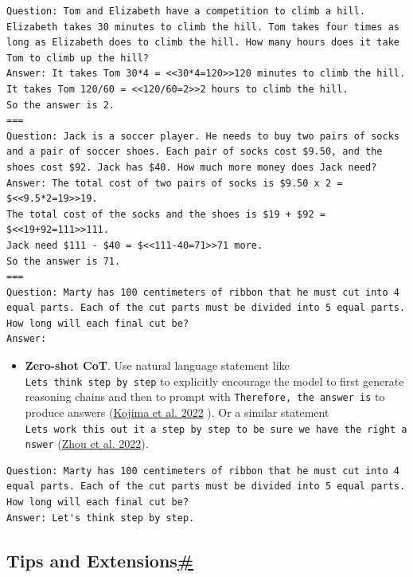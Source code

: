 \begin{verbatim}
Question: Tom and Elizabeth have a competition to climb a hill. Elizabeth takes 30 minutes to climb the hill. Tom takes four times as long as Elizabeth does to climb the hill. How many hours does it take Tom to climb up the hill?
Answer: It takes Tom 30*4 = <<30*4=120>>120 minutes to climb the hill.
It takes Tom 120/60 = <<120/60=2>>2 hours to climb the hill.
So the answer is 2.
===
Question: Jack is a soccer player. He needs to buy two pairs of socks and a pair of soccer shoes. Each pair of socks cost $9.50, and the shoes cost $92. Jack has $40. How much more money does Jack need?
Answer: The total cost of two pairs of socks is $9.50 x 2 = $<<9.5*2=19>>19.
The total cost of the socks and the shoes is $19 + $92 = $<<19+92=111>>111.
Jack need $111 - $40 = $<<111-40=71>>71 more.
So the answer is 71.
===
Question: Marty has 100 centimeters of ribbon that he must cut into 4 equal parts. Each of the cut parts must be divided into 5 equal parts. How long will each final cut be?
Answer:
\end{verbatim}

\begin{itemize}
\tightlist
\item
  \textbf{Zero-shot CoT}. Use natural language statement like \texttt{Let\textquotesingle{}s\ think\ step\ by\ step} to explicitly encourage the model to first generate reasoning chains and then to prompt with \texttt{Therefore,\ the\ answer\ is} to produce answers (\href{https://arxiv.org/abs/2205.11916}{Kojima et al. 2022} ). Or a similar statement \texttt{Let\textquotesingle{}s\ work\ this\ out\ it\ a\ step\ by\ step\ to\ be\ sure\ we\ have\ the\ right\ answer} (\href{https://arxiv.org/abs/2211.01910}{Zhou et al. 2022}).
\end{itemize}

\begin{verbatim}
Question: Marty has 100 centimeters of ribbon that he must cut into 4 equal parts. Each of the cut parts must be divided into 5 equal parts. How long will each final cut be?
Answer: Let's think step by step.
\end{verbatim}

\subsection{\texorpdfstring{Tips and Extensions\hyperref[tips-and-extensions]{\#}}{Tips and Extensions\#}}\label{tips-and-extensions}

